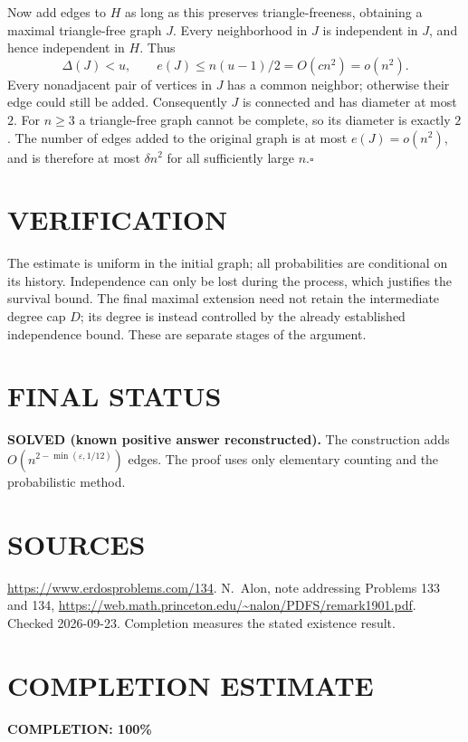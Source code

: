 Now add edges to $H$ as long as this preserves triangle-freeness,
obtaining a maximal triangle-free graph $J$. Every neighborhood in $J$
is independent in $J$, and hence independent in $H$. Thus
\[
 \Delta(J)<u,\qquad e(J)\le n(u-1)/2=O(cn^2)=o(n^2).
\]
Every nonadjacent pair of vertices in $J$ has a common neighbor;
otherwise their edge could still be added. Consequently $J$ is
connected and has diameter at most $2$. For $n\ge3$ a triangle-free
graph cannot be complete, so its diameter is exactly $2$.
The number of edges added to the original graph is at most
$e(J)=o(n^2)$, and is therefore at most $\delta n^2$ for all sufficiently
large $n$.\hfill$\square$

\section{VERIFICATION}
The estimate is uniform in the initial graph; all probabilities are
conditional on its history. Independence can only be lost during the
process, which justifies the survival bound. The final maximal extension
need not retain the intermediate degree cap $D$; its degree is instead
controlled by the already established independence bound. These are
separate stages of the argument.

\section{FINAL STATUS}
\textbf{SOLVED (known positive answer reconstructed).}
The construction adds $O(n^{2-\min(\varepsilon,1/12)})$ edges. The proof
uses only elementary counting and the probabilistic method.

\section{SOURCES}
\url{https://www.erdosproblems.com/134}.
N.~Alon, note addressing Problems 133 and 134,
\url{https://web.math.princeton.edu/~nalon/PDFS/remark1901.pdf}.
Checked 2026-09-23. Completion measures the stated existence result.

\section{COMPLETION ESTIMATE}
\textbf{COMPLETION: 100\%}
